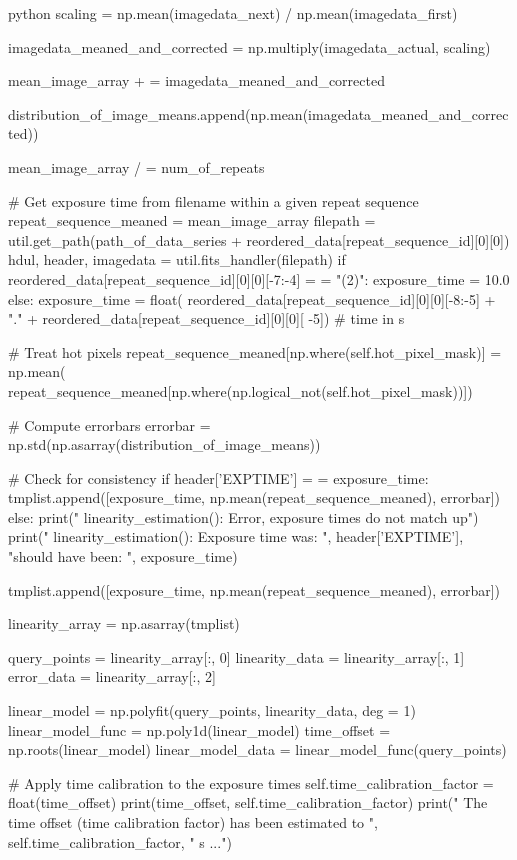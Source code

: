 \documentclass[../main.tex]{subfiles}
\begin{document}
\begin{mintedbox}{python}
scaling  =  np.mean(imagedata_next) / np.mean(imagedata_first)

imagedata_meaned_and_corrected  =  np.multiply(imagedata_actual, scaling)

mean_image_array + =  imagedata_meaned_and_corrected

distribution_of_image_means.append(np.mean(imagedata_meaned_and_corrected))

mean_image_array / =  num_of_repeats

# Get exposure time from filename within a given repeat sequence
repeat_sequence_meaned  =  mean_image_array
filepath  =  util.get_path(path_of_data_series + reordered_data[repeat_sequence_id][0][0])
hdul, header, imagedata  =  util.fits_handler(filepath)
if reordered_data[repeat_sequence_id][0][0][-7:-4]  =  =  "(2)":
exposure_time  =  10.0
else:
exposure_time  =  float(
reordered_data[repeat_sequence_id][0][0][-8:-5] + "." + reordered_data[repeat_sequence_id][0][0][
-5])  # time in s

# Treat hot pixels
repeat_sequence_meaned[np.where(self.hot_pixel_mask)]  =  np.mean(
repeat_sequence_meaned[np.where(np.logical_not(self.hot_pixel_mask))])

# Compute errorbars
errorbar  =  np.std(np.asarray(distribution_of_image_means))

# Check for consistency
if header['EXPTIME']  =  =  exposure_time:
tmplist.append([exposure_time, np.mean(repeat_sequence_meaned), errorbar])
else:
print("  linearity_estimation(): Error, exposure times do not match up")
print("  linearity_estimation(): Exposure time was: ", header['EXPTIME'], "should have been: ",
exposure_time)

tmplist.append([exposure_time, np.mean(repeat_sequence_meaned), errorbar])

linearity_array  =  np.asarray(tmplist)

query_points  =  linearity_array[:, 0]
linearity_data  =  linearity_array[:, 1]
error_data  =  linearity_array[:, 2]

linear_model  =  np.polyfit(query_points, linearity_data, deg = 1)
linear_model_func  =  np.poly1d(linear_model)
time_offset  =  np.roots(linear_model)
linear_model_data  =  linear_model_func(query_points)

# Apply time calibration to the exposure times
self.time_calibration_factor  =  float(time_offset)
print(time_offset, self.time_calibration_factor)
print("  The time offset (time calibration factor) has been estimated to ", self.time_calibration_factor,
" s ...")


\end{mintedbox}
\end{document}
